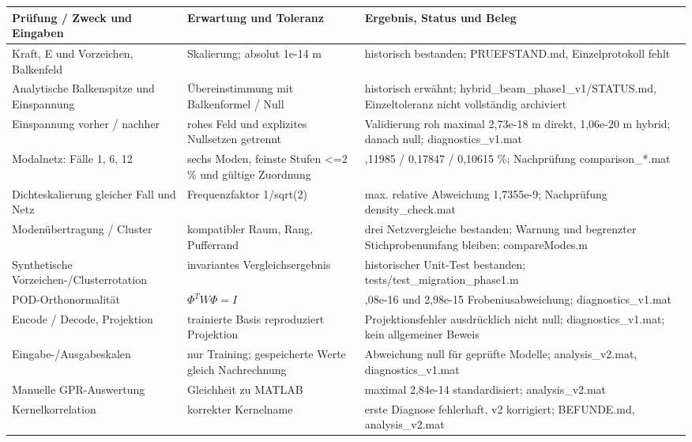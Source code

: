 \documentclass[11pt,a4paper]{article}
\begin{document}
\begingroup\small\begin{longtable}{>{\raggedright\arraybackslash}p{}>{\raggedright\arraybackslash}p{}>{\raggedright\arraybackslash}p{}}
\toprule
Prüfung / Zweck und Eingaben & Erwartung und Toleranz & Ergebnis, Status und Beleg\\ \midrule\endhead
Kraft, E und Vorzeichen, Balkenfeld & Skalierung; absolut 1e-14 m & historisch bestanden; PRUEFSTAND.md, Einzelprotokoll fehlt\\
Analytische Balkenspitze und Einspannung & Übereinstimmung mit Balkenformel / Null & historisch erwähnt; hybrid\_\allowbreak{}beam\_\allowbreak{}phase1\_\allowbreak{}v1/STATUS.md, Einzeltoleranz nicht vollständig archiviert\\
Einspannung vorher / nachher & rohes Feld und explizites Nullsetzen getrennt & Validierung roh maximal 2,73e-18 m direkt, 1,06e-20 m hybrid; danach null; diagnostics\_\allowbreak{}v1.mat\\
Modalnetz: Fälle 1, 6, 12 & sechs Moden, feinste Stufen <=2 \% und gültige Zuordnung & 0,11985 / 0,17847 / 0,10615 \%; Nachprüfung comparison\_\allowbreak{}*.mat\\
Dichteskalierung gleicher Fall und Netz & Frequenzfaktor 1/sqrt(2) & max. relative Abweichung 1,7355e-9; Nachprüfung density\_\allowbreak{}check.mat\\
Modenübertragung / Cluster & kompatibler Raum, Rang, Pufferrand & drei Netzvergleiche bestanden; Warnung und begrenzter Stichprobenumfang bleiben; compareModes.m\\
Synthetische Vorzeichen-/Clusterrotation & invariantes Vergleichsergebnis & historischer Unit-Test bestanden; tests/test\_\allowbreak{}migration\_\allowbreak{}phase1.m\\
POD-Orthonormalität & $\Phi^TW\Phi=I$ & 8,08e-16 und 2,98e-15 Frobeniusabweichung; diagnostics\_\allowbreak{}v1.mat\\
Encode / Decode, Projektion & trainierte Basis reproduziert Projektion & Projektionsfehler ausdrücklich nicht null; diagnostics\_\allowbreak{}v1.mat; kein allgemeiner Beweis\\
Eingabe-/Ausgabeskalen & nur Training; gespeicherte Werte gleich Nachrechnung & Abweichung null für geprüfte Modelle; analysis\_\allowbreak{}v2.mat, diagnostics\_\allowbreak{}v1.mat\\
Manuelle GPR-Auswertung & Gleichheit zu MATLAB & maximal 2,84e-14 standardisiert; analysis\_\allowbreak{}v2.mat\\
Kernelkorrelation & korrekter Kernelname & erste Diagnose fehlerhaft, v2 korrigiert; BEFUNDE.md, analysis\_\allowbreak{}v2.mat\\

\end{longtable}
\end{document}
